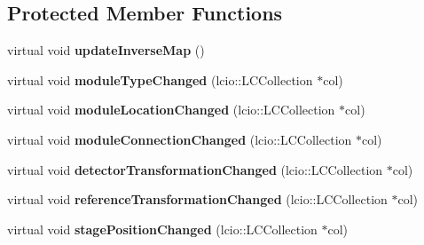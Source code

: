 \subsection*{Protected Member Functions}
\begin{DoxyCompactItemize}
\item 
virtual void {\bfseries updateInverseMap} ()\label{classCALICE_1_1fastMappingIIProcessor_ac8554c8b7fe9ed1e0ca25a08eeb8f527}

\item 
virtual void {\bfseries moduleTypeChanged} (lcio::LCCollection $\ast$col)\label{classCALICE_1_1fastMappingIIProcessor_a28c17f0864be618ad5168c9849f1ea01}

\item 
virtual void {\bfseries moduleLocationChanged} (lcio::LCCollection $\ast$col)\label{classCALICE_1_1fastMappingIIProcessor_aaa57f57f89b2b16635dba790b60c212c}

\item 
virtual void {\bfseries moduleConnectionChanged} (lcio::LCCollection $\ast$col)\label{classCALICE_1_1fastMappingIIProcessor_a06bf0a87fa87dd8ed6bd979b8fbeb86b}

\item 
virtual void {\bfseries detectorTransformationChanged} (lcio::LCCollection $\ast$col)\label{classCALICE_1_1fastMappingIIProcessor_a40c88849c1b343429941a7b64553aa63}

\item 
virtual void {\bfseries referenceTransformationChanged} (lcio::LCCollection $\ast$col)\label{classCALICE_1_1fastMappingIIProcessor_a13db4be9a8c31bb01a20915394007d12}

\item 
virtual void {\bfseries stagePositionChanged} (lcio::LCCollection $\ast$col)\label{classCALICE_1_1fastMappingIIProcessor_af962a3c913e7154e79d52ca661526e38}

\end{DoxyCompactItemize}
